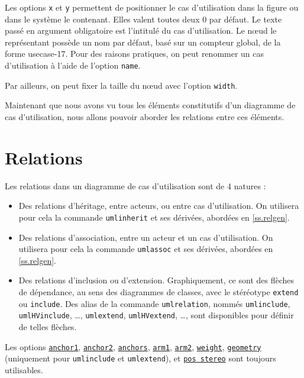 \documentclass[a4paper,11pt]{report}
\begin{document}
\medskip

Les options {\tt x} et {\tt y} permettent de positionner le cas d'utilisation dans la figure ou dans le système le contenant. Elles valent toutes deux 0 par défaut. Le texte passé en argument obligatoire est l'intitulé du cas d'utilisation. Le n\oe{}ud le représentant possède un nom par défaut, basé sur un compteur global, de la forme usecase-17. Pour des raisons pratiques, on peut renommer un cas d'utilisation à l'aide de l'option {\tt name}.

Par ailleurs, on peut fixer la taille du n\oe{}ud avec l'option {\tt width}.

\medskip

Maintenant que nous avons vu tous les éléments constitutifs d'un diagramme de cas d'utilisation, nous allons pouvoir aborder les relations entre ces éléments.

\section{Relations}\label{s.userel}

Les relations dans un diagramme de cas d'utilisation sont de 4 natures :

\begin{itemize}
\item Des relations d'héritage, entre acteurs, ou entre cas d'utilisation. On utilisera pour cela la commande {\tt umlinherit} et ses dérivées, abordées en \autoref{ss.relgen}.
\item Des relations d'association, entre un acteur et un cas d'utilisation. On utilisera pour cela la commande {\tt umlassoc} et ses dérivées, abordées en \autoref{ss.relgen}.
\item Des relations d'inclusion ou d'extension. Graphiquement, ce sont des flèches de dépendance, au sens des diagrammes de classes, avec le stéréotype {\tt extend} ou {\tt include}. Des alias de la commande {\tt umlrelation}, nommés {\tt umlinclude}, {\tt umlHVinclude}, \ldots, {\tt umlextend}, {\tt umlHVextend}, \ldots, sont disponibles pour définir de telles flèches.
\end{itemize}

Les options \hyperlink{anchor1}{{\tt anchor1}}, \hyperlink{anchor2}{{\tt anchor2}}, \hyperlink{anchors}{{\tt anchors}}, \hyperlink{arm1}{{\tt arm1}}, \hyperlink{arm2}{{\tt arm2}}, \hyperlink{weight}{{\tt weight}}, \hyperlink{geometry}{{\tt geometry}} (uniquement pour {\tt umlinclude} et {\tt umlextend}), et \hyperlink{posstereo}{{\tt pos stereo}} sont toujours utilisables.
\end{document}
